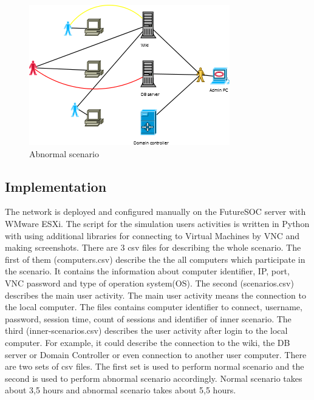 \documentclass{article}
\begin{document}
\begin{figure}[ht!]
\centering
\includegraphics{scenario_abnormal.png}
\caption{Abnormal scenario}
\label{overflow}
\end{figure}

\subsection{Implementation}
The network is deployed and configured manually on the FutureSOC server with WMware ESXi. The script for the simulation users activities is written in Python with using additional libraries for connecting to Virtual Machines by VNC and making screenshots. There are 3 csv files for describing the whole scenario. The first of them (computers.csv) describe the the all computers which participate in the scenario. It contains the information about computer identifier, IP, port, VNC password and type of operation system(OS).
The second (scenarios.csv) describes the main user activity. The main user activity means the connection to the local computer. The files contains computer identifier to connect, username, password, session time, count of sessions and identifier of inner scenario.
The third (inner-scenarios.csv) describes the user activity after login to the local computer. For example, it could describe the connection to the wiki, the DB server or Domain Controller or even connection to another user computer.  
There are two sets of csv files. The first set is used to perform normal scenario and the second is used to perform abnormal scenario 	
accordingly. Normal scenario takes about 3,5 hours and abnormal scenario takes about 5,5 hours.
 
\end{document}
